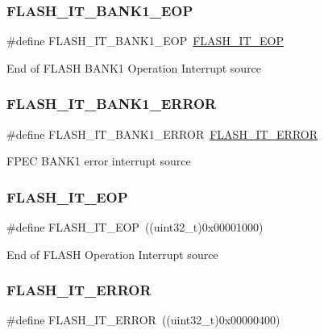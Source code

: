\subsubsection{\texorpdfstring{FLASH\_IT\_BANK1\_EOP}{FLASH\_IT\_BANK1\_EOP}}
{\footnotesize\ttfamily \#define F\+L\+A\+S\+H\+\_\+\+I\+T\+\_\+\+B\+A\+N\+K1\+\_\+\+E\+OP~\mbox{\hyperlink{group___f_l_a_s_h___interrupts_gaea20e80e1806d58a7544cfe8659e7f11}{F\+L\+A\+S\+H\+\_\+\+I\+T\+\_\+\+E\+OP}}}

End of F\+L\+A\+SH B\+A\+N\+K1 Operation Interrupt source \mbox{\label{group___f_l_a_s_h___interrupts_ga808627239be1bf9c2d8bfed36ec4db19}} 
\subsubsection{\texorpdfstring{FLASH\_IT\_BANK1\_ERROR}{FLASH\_IT\_BANK1\_ERROR}}
{\footnotesize\ttfamily \#define F\+L\+A\+S\+H\+\_\+\+I\+T\+\_\+\+B\+A\+N\+K1\+\_\+\+E\+R\+R\+OR~\mbox{\hyperlink{group___f_l_a_s_h___interrupts_ga61c74493d4c1f36ddaf563719d446a7d}{F\+L\+A\+S\+H\+\_\+\+I\+T\+\_\+\+E\+R\+R\+OR}}}

F\+P\+EC B\+A\+N\+K1 error interrupt source \mbox{\label{group___f_l_a_s_h___interrupts_gaea20e80e1806d58a7544cfe8659e7f11}} 
\subsubsection{\texorpdfstring{FLASH\_IT\_EOP}{FLASH\_IT\_EOP}}
{\footnotesize\ttfamily \#define F\+L\+A\+S\+H\+\_\+\+I\+T\+\_\+\+E\+OP~((uint32\+\_\+t)0x00001000)}

End of F\+L\+A\+SH Operation Interrupt source \mbox{\label{group___f_l_a_s_h___interrupts_ga61c74493d4c1f36ddaf563719d446a7d}} 
\subsubsection{\texorpdfstring{FLASH\_IT\_ERROR}{FLASH\_IT\_ERROR}}
{\footnotesize\ttfamily \#define F\+L\+A\+S\+H\+\_\+\+I\+T\+\_\+\+E\+R\+R\+OR~((uint32\+\_\+t)0x00000400)}


